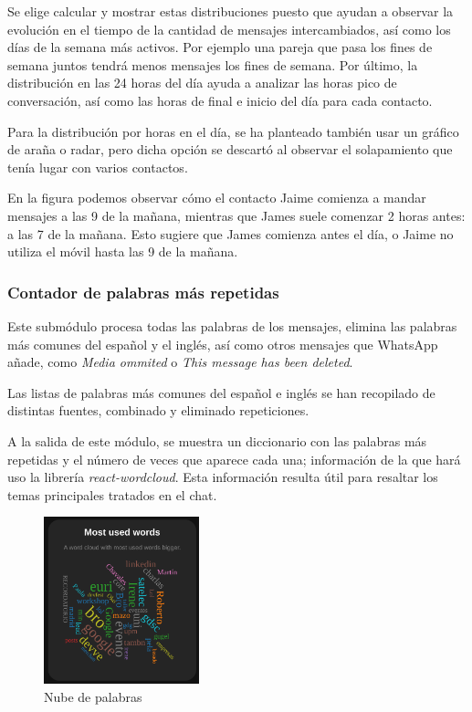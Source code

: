 Se elige calcular y mostrar estas distribuciones puesto que ayudan a observar la evolución en el tiempo de la cantidad de mensajes intercambiados, así como los días de la semana más activos. Por ejemplo una pareja que pasa los fines de semana juntos tendrá menos mensajes los fines de semana. Por último, la distribución en las 24 horas del día ayuda a analizar las horas pico de conversación, así como las horas de final e inicio del día para cada contacto.

Para la distribución por horas en el día, se ha planteado también usar un gráfico de araña o radar, pero dicha opción se descartó al observar el solapamiento que tenía lugar con varios contactos.

En la figura podemos observar cómo el contacto Jaime comienza a mandar mensajes a las 9 de la mañana, mientras que James suele comenzar 2 horas antes: a las 7 de la mañana. Esto sugiere que James comienza antes el día, o Jaime no utiliza el móvil hasta las 9 de la mañana.

\subsubsection{Contador de palabras más repetidas}

Este submódulo procesa todas las palabras de los mensajes, elimina las palabras más comunes del español y el inglés, así como otros mensajes que WhatsApp añade, como \textit{Media ommited} o \textit{This message has been deleted}.

Las listas de palabras más comunes del español e inglés se han recopilado de distintas fuentes, combinado y eliminado repeticiones.

A la salida de este módulo, se muestra un diccionario con las palabras más repetidas y el número de veces que aparece cada una; información de la que hará uso la librería \textit{react-wordcloud}. Esta información resulta útil para resaltar los temas principales tratados en el chat.

\begin{figure}[H]
	\centering
	\includegraphics[width=0.4\textwidth]{img/word_cloud.png}
	\caption{Nube de palabras}
	\label{fig:chap4:word_cloud}
\end{figure}

